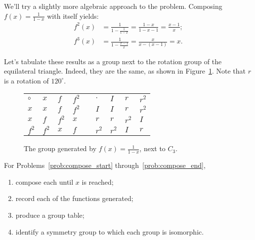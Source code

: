 \documentclass[../gatm.tex]{subfiles}
\begin{document}
We'll try a slightly more algebraic approach to the problem. Composing $f(x)=\frac{1}{1-x}$ with itself yields:
\begin{align*}
f^2(x)&=\frac{1}{1-\frac{1}{1-x}}=\frac{1-x}{1-x-1}=\frac{x-1}{x}; \\
f^3(x)&=\frac{1}{1-\frac{x-1}{x}}=\frac{x}{x-(x-1)}=x.
\end{align*}

Let's tabulate these results as a group next to the rotation group of the equilateral triangle. Indeed, they are the same, as shown in Figure~\ref{fig:vs_cyclic_3}. Note that $r$ is a rotation of $120^\circ$.

\begin{figure}[h]
\begin{center}
\renewcommand*{\arraystretch}{1.2}
\begin{tabular}{l|l|l|l|ll|l|l|l|}
$\circ$  & $x$   & $f$   & $f^2$ &  & $\cdot$ & $I$   & $r$   & $r^2$ \\ \cline{1-4} \cline{6-9} 
$x$   & $x$   & $f$   & $f^2$ &  & $I$   & $I$   & $r$   & $r^2$ \\ \cline{1-4} \cline{6-9} 
$x$   & $f$   & $f^2$ & $x$   &  & $r$   & $r$   & $r^2$ & $I$   \\ \cline{1-4} \cline{6-9} 
$f^2$ & $f^2$ & $x$   & $f$   &  & $r^2$ & $r^2$ & $I$   & $r$   \\ \cline{1-4} \cline{6-9} 
\end{tabular}
\end{center}
\caption{The group generated by $f(x)=\frac{1}{1-x}$, next to $C_3$.}
\label{fig:vs_cyclic_3}
\end{figure}

For Problems~\ref{prob:compose_start} through~\ref{prob:compose_end},
\begin{enumerate}[label=\roman*.]
\item compose each until $x$ is reached;
\item record each of the functions generated;
\item produce a group table;
\item identify a symmetry group to which each group is isomorphic.
\end{enumerate}
\end{document}
